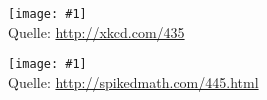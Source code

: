 \documentclass[a4paper,ngerman,landscape]{scrartcl}
\newcommand{\comic}[3]{\begin{center}
  \texttt{[image: \#1]} \\[2em]

  Quelle: \url{#2}
\end{center}\newpage}
\begin{document}
\comic{purity.png}{http://xkcd.com/435}{0.8}
\comic{three-logicians.png}{http://spikedmath.com/445.html}{1.4}
\end{document}
